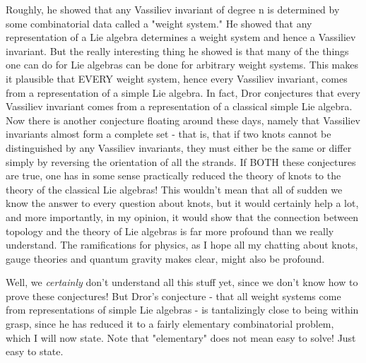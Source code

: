 Roughly, he showed that any Vassiliev invariant of degree n is
determined by some combinatorial data called a "weight system."  He
showed that any representation of a Lie algebra determines a weight
system and hence a Vassiliev invariant.  But the really interesting
thing he showed is that many of the things one can do for Lie algebras
can be done for arbitrary weight systems.  This makes it plausible that
EVERY weight system, hence every Vassiliev invariant, comes from a
representation of a simple Lie algebra.  In fact, Dror conjectures that
every Vassiliev invariant comes from a representation of a classical
simple Lie algebra.  Now there is another conjecture floating around
these days, namely that Vassiliev invariants almost form a complete set
- that is, that if two knots cannot be distinguished by any Vassiliev
invariants, they must either be the same or differ simply by reversing the
orientation of all the strands.  If BOTH these conjectures are true,
one has in some sense practically reduced the theory of knots to the
theory of the classical Lie algebras!  This wouldn't mean that all of
sudden we know the answer to every question about knots, but it would
certainly help a lot, and more importantly, in my opinion, it would show
that the connection between topology and the theory of Lie algebras is far
more profound than we really understand.  The ramifications for physics,
as I hope all my chatting about knots, gauge theories and quantum
gravity makes clear, might also be profound.

Well, we \emph{certainly} don't understand all this stuff yet, since we don't know
how to prove these conjectures!  But Dror's conjecture - that all weight
systems come from representations of simple Lie algebras - is
tantalizingly close to being within grasp, since he has reduced it to a
fairly elementary combinatorial problem, which I will now state.  Note
that "elementary" does not mean easy to solve!  Just easy to state.

